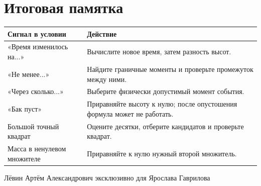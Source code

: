 \documentclass[a4paper,11pt]{article}
\begin{document}
\vspace{9mm}
\section*{Итоговая памятка}
\renewcommand{\arraystretch}{1.28}
\begin{tabularx}{\linewidth}{@{}p{.36\linewidth}X@{}}
\toprule
Сигнал в условии & Действие \\
\midrule
«Время изменилось на...» & Вычислите новое время, затем разность высот.\\
«Не менее...» & Найдите граничные моменты и проверьте промежуток между ними.\\
«Через сколько...» & Выберите физически допустимый момент события.\\
«Бак пуст» & Приравняйте высоту к нулю; после опустошения формула может не работать.\\
Большой точный квадрат & Оцените десятки, отберите кандидатов и проверьте квадрат.\\
Масса в ненулевом множителе & Приравняйте к нулю нужный второй множитель.\\
\bottomrule
\end{tabularx}
\vfill
\begin{center}\footnotesize\color{textgray}Лёвин Артём Александрович эксклюзивно для Ярослава Гаврилова\end{center}
\end{document}
